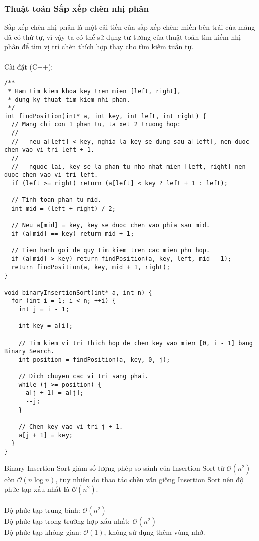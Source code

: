 \documentclass[]{article}
\begin{document}
\subsubsection{Thuật toán Sắp xếp chèn nhị phân}
Sắp xếp chèn nhị phân là một cải tiến của sắp xếp chèn: miền bên trái của mảng đã có thứ tự, vì vậy ta có thể sử dụng tư tưởng của thuật toán tìm kiếm nhị phân để tìm vị trí chèn thích hợp thay cho tìm kiếm tuần tự.
\\\\
Cài đặt (C++):
\begin{lstlisting}
/**
 * Ham tim kiem khoa key tren mien [left, right],
 * dung ky thuat tim kiem nhi phan.
 */
int findPosition(int* a, int key, int left, int right) {
  // Mang chi con 1 phan tu, ta xet 2 truong hop:
  //
  // - neu a[left] < key, nghia la key se dung sau a[left], nen duoc chen vao vi tri left + 1.
  //
  // - nguoc lai, key se la phan tu nho nhat mien [left, right] nen duoc chen vao vi tri left.
  if (left >= right) return (a[left] < key ? left + 1 : left);

  // Tinh toan phan tu mid.
  int mid = (left + right) / 2;

  // Neu a[mid] = key, key se duoc chen vao phia sau mid.
  if (a[mid] == key) return mid + 1;

  // Tien hanh goi de quy tim kiem tren cac mien phu hop.
  if (a[mid] > key) return findPosition(a, key, left, mid - 1);
  return findPosition(a, key, mid + 1, right);
}

void binaryInsertionSort(int* a, int n) {
  for (int i = 1; i < n; ++i) {
    int j = i - 1;

    int key = a[i];

    // Tim kiem vi tri thich hop de chen key vao mien [0, i - 1] bang Binary Search.
    int position = findPosition(a, key, 0, j);

    // Dich chuyen cac vi tri sang phai.
    while (j >= position) {
      a[j + 1] = a[j];
      --j;
    }

    // Chen key vao vi tri j + 1.
    a[j + 1] = key;
  }
}
\end{lstlisting}Binary Insertion Sort giảm số lượng phép so sánh của Insertion Sort từ $\mathcal{O}(n^2)$ còn $\mathcal{O}(n \log n)$, tuy nhiên do thao tác chèn vẫn giống Insertion Sort nên độ phức tạp xấu nhất là $\mathcal{O}(n^2)$.
\\\\
Độ phức tạp trung bình: $\mathcal{O}(n^2)$
\\
Độ phức tạp trong trường hợp xấu nhất: $\mathcal{O}(n^2)$
\\
Độ phức tạp không gian: $\mathcal{O}(1)$, không sử dụng thêm vùng nhớ.
\end{document}
